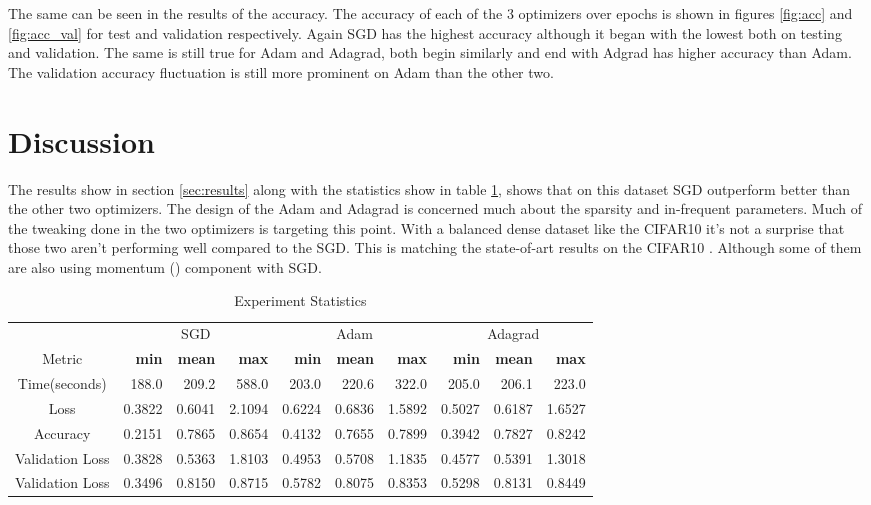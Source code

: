 \documentclass[12pt,twoside]{article}
\theoremstyle{plain}
\theoremstyle{definition}
\theoremstyle{remark}
\begin{document}
The same can be seen in the results of the accuracy. The accuracy of each of the 3 optimizers over epochs is shown in figures \ref{fig:acc} and \ref{fig:acc_val} for test and validation respectively. Again SGD has the highest accuracy although it began with the lowest both on testing and validation.  The same is still true for Adam and Adagrad, both begin similarly and end with Adgrad has higher accuracy than Adam. The validation accuracy fluctuation is still more prominent on Adam than the other two.

\section{Discussion}
The results show in section \ref{sec:results} along with the statistics show in table \ref{tab:hresult}, shows that on this dataset SGD outperform better than the other two optimizers. The design of the Adam and Adagrad is concerned much about the sparsity and in-frequent parameters. Much of the tweaking done in the two optimizers is targeting this point. With a balanced dense dataset like the CIFAR10 it's not a surprise that those two aren't performing well compared to the SGD. This is matching the state-of-art results on the CIFAR10 \cite{Graham14} \cite{Graham14a} \cite{SpringenbergDBR14} \cite{MishkinM15}. Although some of them are also using momentum (\cite{Qian99onthe}) component with SGD.

\begin{table}[H]
\caption{Experiment Statistics} %
\centering %
\begin{tabular}{c r|r|r|r|r|r|r|r|r} %
\hline\hline %
\multicolumn{1}{c}{} &\multicolumn{3}{c}{SGD} &\multicolumn{3}{c}{Adam} &\multicolumn{3}{c}{Adagrad}\\ [0.5ex]
Metric & \textbf{min}& \textbf{mean} &\textbf{max} & \textbf{min}& \textbf{mean} &\textbf{max} & \textbf{min}& \textbf{mean} &\textbf{max}\\
\hline %
Time(seconds) & 188.0& 209.2 & 588.0& 203.0& 220.6& 322.0& 205.0& 206.1& 223.0 \\ %
\hline
Loss  & 0.3822 & 0.6041 & 2.1094& 0.6224& 0.6836& 1.5892& 0.5027& 0.6187& 1.6527 \\
\hline
Accuracy & 0.2151 & 0.7865 & 0.8654& 0.4132& 0.7655& 0.7899& 0.3942& 0.7827& 0.8242 \\[1ex] %
\hline
Validation Loss  & 0.3828 & 0.5363 & 1.8103& 0.4953& 0.5708& 1.1835& 0.4577& 0.5391& 1.3018 \\
\hline
Validation Loss & 0.3496 & 0.8150 & 0.8715& 0.5782& 0.8075& 0.8353& 0.5298& 0.8131& 0.8449 \\[1ex] %
\hline %
\end{tabular}
\label{tab:hresult}
\end{table}
\end{document}
